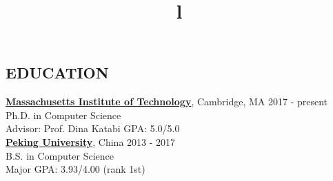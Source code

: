 \documentclass[margin]{res}
\newcommand{\Bullet}[1]{{\raisebox{0.25ex}{\tiny$\bullet$\ }}{#1}\\}
\begin{document}


\address{ \href{mailto:haohe@mit.edu}{haohe@mit.edu} $\mid$ {+1\ 617-840-0491} }


\begin{resume}

\section{EDUCATION}
\href{http://web.mit.edu}{\textbf{Massachusetts Institute of Technology}}, Cambridge, MA
\hfill 2017 - present
\\
Ph.D. in Computer Science
\\
\Bullet{Advisor: Prof. Dina Katabi    \qquad GPA: 5.0/5.0}
\href{http://english.pku.edu.cn/}{\textbf{Peking University}}, China
\hfill 2013 - 2017
\\
B.S. in Computer Science
\\
\Bullet{Major GPA: 3.93/4.00 (rank 1st)}
\vspace{-15mm}

\begin{format}
\title{l} \hfill {}\\
\body\\
\end{format}


\end{resume}
\end{document}
